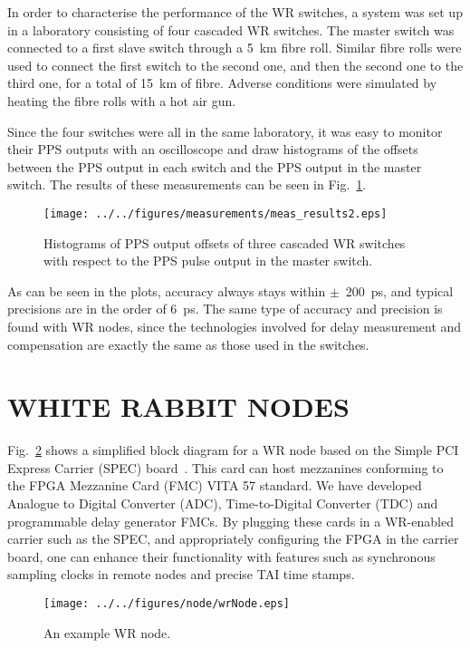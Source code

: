 \documentclass{../JAC2003}
\begin{document}
In order to characterise the performance of the WR switches, a system
was set up in a laboratory consisting of four cascaded WR
switches. The master switch was connected to a first slave switch
through a 5~km fibre roll. Similar fibre rolls were used to connect
the first switch to the second one, and then the second one to the
third one, for a total of 15~km of fibre. Adverse conditions were
simulated by heating the fibre rolls with a hot air gun. 

Since the four switches were all in the same laboratory, it was easy
to monitor their PPS outputs with an oscilloscope and draw histograms
of the offsets between the PPS output in each switch and the PPS
output in the master switch. The results of these measurements can be
seen in Fig.~\ref{performance-fig}.

\begin{figure}[htb]
   \centering
   \texttt{[image: ../../figures/measurements/meas\_results2.eps]}
   \caption{Histograms of PPS output offsets of three cascaded WR
     switches with respect to the PPS pulse output in the master switch.}
   \label{performance-fig}
\end{figure}

As can be seen in the plots, accuracy always stays within
$\pm$~200~ps, and typical precisions are in the order of 6~ps. The
same type of accuracy and precision is found with WR nodes, since the
technologies involved for delay measurement and compensation are
exactly the same as those used in the switches.

\section{WHITE RABBIT NODES}

Fig.~\ref{node-fig} shows a simplified block diagram for a WR node
based on the Simple PCI Express Carrier (SPEC)
board~\cite{spec-ref}. This card can host mezzanines conforming to the
FPGA Mezzanine Card (FMC) VITA 57 standard. We have developed Analogue
to Digital Converter (ADC), Time-to-Digital Converter (TDC) and
programmable delay generator FMCs. By plugging these cards in a
WR-enabled carrier such as the SPEC, and appropriately configuring the
FPGA in the carrier board, one can enhance their functionality with
features such as synchronous sampling clocks in remote nodes and
precise TAI time stamps.

\begin{figure}[htb]
   \centering
   \texttt{[image: ../../figures/node/wrNode.eps]}
   \caption{An example WR node.}
   \label{node-fig}
\end{figure}
\end{document}
